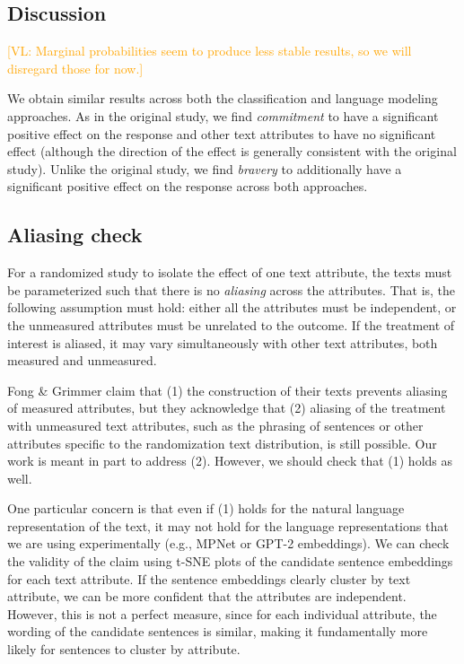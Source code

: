 \documentclass{article}
\newcommand{\vl}[1]{\textcolor{orange}{[VL: #1]}}
\begin{document}
\subsection{Discussion}

\vl{Marginal probabilities seem to produce less stable results, so we will disregard those for now.}

We obtain similar results across both the classification and language modeling approaches.  As in the original study, we find \textit{commitment} to have a significant positive effect on the response and other text attributes to have no significant effect (although the direction of the effect is generally consistent with the original study). Unlike the original study, we find \textit{bravery} to additionally have a significant positive effect on the response across both approaches.

\subsection{Aliasing check}

For a randomized study to isolate the effect of one text attribute, the texts must be parameterized such that there is no \textit{aliasing} across the attributes. That is, the following assumption must hold: either all the attributes must be independent, or the unmeasured attributes must be unrelated to the outcome. If the treatment of interest is aliased, it may vary simultaneously with other text attributes, both measured and unmeasured.

Fong \& Grimmer claim that (1) the construction of their texts prevents aliasing of measured attributes, but they acknowledge that (2) aliasing of the treatment with unmeasured text attributes, such as the phrasing of sentences or other attributes specific to the randomization text distribution, is still possible. Our work is meant in part to address (2). However, we should check that (1) holds as well. 

One particular concern is that even if (1) holds for the natural language representation of the text, it may not hold for the language representations that we are using experimentally (e.g., MPNet or GPT-2 embeddings). We can check the validity of the claim using t-SNE plots of the candidate sentence embeddings for each text attribute. If the sentence embeddings clearly cluster by text attribute, we can be more confident that the attributes are independent. However, this is not a perfect measure, since for each individual attribute, the wording of the candidate sentences is similar, making it fundamentally more likely for sentences to cluster by attribute.
\end{document}
